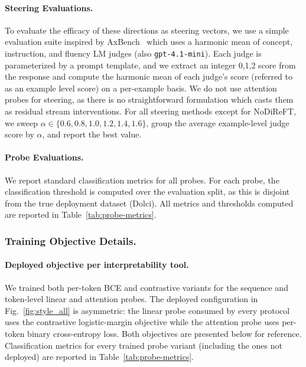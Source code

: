 \documentclass{article} %
\begin{document}
\paragraph{Steering Evaluations.} To evaluate the efficacy of these directions as steering vectors, we use a simple evaluation suite inspired by AxBench~\citep{wu2025axbench} which uses a harmonic mean of concept, instruction, and fluency LM judges (also \texttt{gpt-4.1-mini}). Each judge is parameterized by a prompt template, and we extract an integer 0,1,2 score from the response and compute the harmonic mean of each judge's score (referred to as an example level score) on a per-example basis. We do not use attention probes for steering, as there is no straightforward formulation which casts them as residual stream interventions. For all steering methods except for NoDiReFT, we sweep $\alpha\in\{0.6,0.8,1.0,1.2,1.4,1.6\}$, group the average example-level judge score by $\alpha$, and report the best value.

\paragraph{Probe Evaluations.} We report standard classification metrics for all probes. For each probe, the classification threshold is computed over the evaluation split, as this is disjoint from the true deployment dataset (Dolci). All metrics and thresholds computed are reported in Table~\ref{tab:probe-metrics}.

\subsubsection{Training Objective Details.}
\label{apdx:probe-training-objectives}

\paragraph{Deployed objective per interpretability tool.}
We trained both per-token BCE and contrastive variants for the
sequence and token-level linear and attention probes. The deployed
configuration in Fig.~\ref{fig:style_all} is asymmetric:
the linear probe consumed by every protocol uses the contrastive logistic-margin objective while
the attention probe uses per-token binary cross-entropy loss. Both objectives are presented below for
reference. Classification metrics for every trained probe variant (including the
ones not deployed) are reported in Table~\ref{tab:probe-metrics}.
\end{document}
